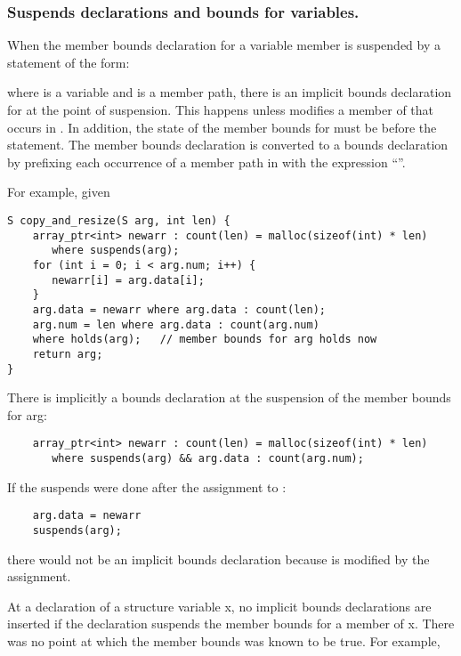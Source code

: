 \subsubsection{Suspends declarations and bounds for variables.}

When the member bounds declaration  for a variable member is
suspended by a statement of the form:

  \code{);}

where  is a variable and  is a member path, there is an
implicit bounds declaration for  at the point
of suspension. This happens unless  modifies a member 
of  that occurs in . In addition, the state of the
member bounds for  must be 
before the statement. The member bounds declaration  is
converted to a bounds declaration by prefixing each occurrence of a
member path in  with the expression ``''.

For example, given

\begin{lstlisting}
S copy_and_resize(S arg, int len) {
    array_ptr<int> newarr : count(len) = malloc(sizeof(int) * len)
       where suspends(arg);
    for (int i = 0; i < arg.num; i++) {
       newarr[i] = arg.data[i];
    }
    arg.data = newarr where arg.data : count(len);
    arg.num = len where arg.data : count(arg.num)
    where holds(arg);   // member bounds for arg holds now
    return arg;
}
\end{lstlisting}


There is implicitly a bounds declaration at the suspension of the member
bounds for arg:

\begin{lstlisting}
    array_ptr<int> newarr : count(len) = malloc(sizeof(int) * len)
       where suspends(arg) && arg.data : count(arg.num);
\end{lstlisting}

If the suspends were done after the assignment to :

\begin{lstlisting}
    arg.data = newarr
    suspends(arg);
\end{lstlisting}

there would not be an implicit bounds declaration because  is
modified by the assignment.

At a declaration of a structure variable x, no implicit bounds
declarations are inserted if the declaration suspends the member bounds
for a member of x. There was no point at which the member bounds was
known to be true. For example,

